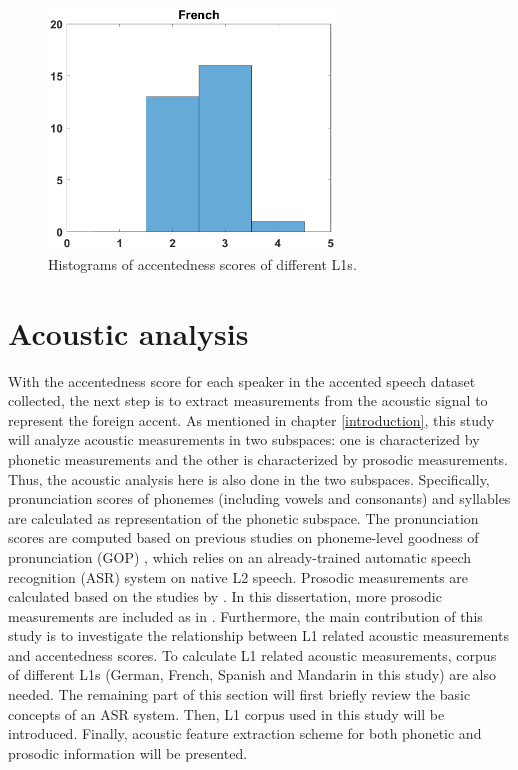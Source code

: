 \begin{figure}[h]
\begin{minipage}[t]{0.5\linewidth}
        \end{minipage}%
        \begin{minipage}[t]{0.5\linewidth}
        \centering
            \includegraphics[width=3in]{figures/French_hist.eps}
        \end{minipage}%
        \caption{Histograms of accentedness scores of different L1s.}
        \centering
        \label{fig0}
     \end{figure}

\section{Acoustic analysis}

With the accentedness score for each speaker in the accented speech dataset collected, the next step is to extract measurements from the acoustic signal to represent the foreign accent. As mentioned in chapter \ref{introduction}, this study will analyze acoustic measurements in two subspaces: one is characterized by phonetic measurements and the other is characterized by prosodic measurements. Thus, the acoustic analysis here is also done in the two subspaces. Specifically, pronunciation scores of phonemes (including vowels and consonants) and syllables are calculated as representation of the phonetic subspace. The pronunciation scores are computed based on previous studies on phoneme-level goodness of pronunciation (GOP) \citep{witt2000phone}, which relies on an already-trained automatic speech recognition (ASR) system on native L2 speech. Prosodic measurements are calculated based on the studies by \cite{ramus1999correlates,grabe2002durational}. In this dissertation, more prosodic measurements are included as in \citep{lai2013applying}. Furthermore, the main contribution of this study is to investigate the relationship between L1 related acoustic measurements and accentedness scores. To calculate L1 related acoustic measurements, corpus of different L1s (German, French, Spanish and Mandarin in this study) are also needed. The remaining part of this section will first briefly review the basic concepts of an ASR system. Then, L1 corpus used in this study will be introduced. Finally, acoustic feature extraction scheme for both phonetic and prosodic information will be presented.

